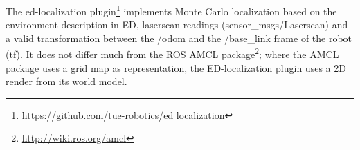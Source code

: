 The \acrshort{ed}-localization plugin\footnote{\url{https://github.com/tue-robotics/ed localization}}  implements Monte Carlo localization  based on the environment description in ED, laserscan readings (sensor\_msgs/Laserscan) and a valid transformation between the /odom and the /base\_link frame of the robot (tf). It does not differ much from the ROS AMCL package\footnote{\url{http://wiki.ros.org/amcl}}; where the AMCL package uses a grid map as representation, the ED-localization plugin uses a 2D render from its world model. 